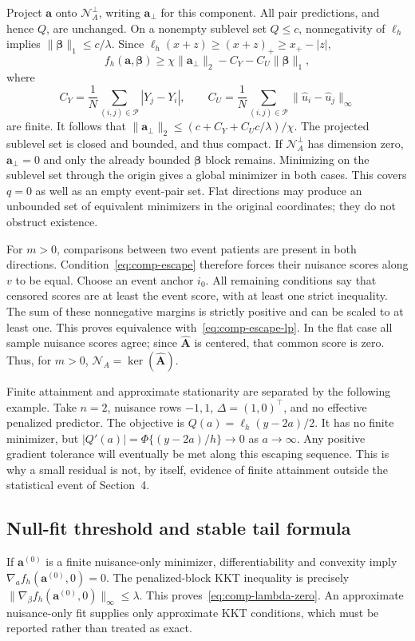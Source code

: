 Project $\bm{a}$ onto $\mathcal N_A^\perp$, writing $\bm{a}_\perp$ for this component. All pair predictions, and hence $Q$, are unchanged. On a nonempty sublevel set $Q\le c$, nonnegativity of $\ell_h$ implies $\|\bm{\beta}\|_1\le c/\lambda$. Since $\ell_h(x+z)\ge(x+z)_+\ge x_+-|z|$,
\[
 f_h(\bm{a},\bm{\beta})\ge\chi\|\bm{a}_\perp\|_2-C_Y-C_U\|\bm{\beta}\|_1,
\]
where
\[
 C_Y=\frac1N\sum_{(i,j)\in\mathcal P}|Y_j-Y_i|,\qquad
 C_U=\frac1N\sum_{(i,j)\in\mathcal P}\|\widehat u_i-\widehat u_j\|_\infty
\]
are finite. It follows that $\|\bm{a}_\perp\|_2\le(c+C_Y+C_Uc/\lambda)/\chi$. The projected sublevel set is closed and bounded, and thus compact. If $\mathcal N_A^\perp$ has dimension zero, $\bm{a}_\perp=0$ and only the already bounded $\bm{\beta}$ block remains. Minimizing on the sublevel set through the origin gives a global minimizer in both cases. This covers $q=0$ as well as an empty event-pair set. Flat directions may produce an unbounded set of equivalent minimizers in the original coordinates; they do not obstruct existence.

For $m>0$, comparisons between two event patients are present in both directions. Condition~\eqref{eq:comp-escape} therefore forces their nuisance scores along $v$ to be equal. Choose an event anchor $i_0$. All remaining conditions say that censored scores are at least the event score, with at least one strict inequality. The sum of these nonnegative margins is strictly positive and can be scaled to at least one. This proves equivalence with~\eqref{eq:comp-escape-lp}. In the flat case all sample nuisance scores agree; since $\widehat{\bm{A}}$ is centered, that common score is zero. Thus, for $m>0$, $\mathcal N_A=\ker(\widehat{\bm{A}})$.

Finite attainment and approximate stationarity are separated by the following example. Take $n=2$, nuisance rows $-1,1$, $\Delta=(1,0)^\top$, and no effective penalized predictor. The objective is $Q(a)=\ell_h(y-2a)/2$. It has no finite minimizer, but $|Q'(a)|=\Phi\{(y-2a)/h\}\to0$ as $a\to\infty$. Any positive gradient tolerance will eventually be met along this escaping sequence. This is why a small residual is not, by itself, evidence of finite attainment outside the statistical event of Section~4.

\subsection{Null-fit threshold and stable tail formula}
\label{subapp:comp-tail}
If $\bm{a}^{(0)}$ is a finite nuisance-only minimizer, differentiability and convexity imply $\nabla_a f_h(\bm{a}^{(0)},0)=0$. The penalized-block KKT inequality is precisely $\|\nabla_\beta f_h(\bm{a}^{(0)},0)\|_\infty\le\lambda$. This proves~\eqref{eq:comp-lambda-zero}. An approximate nuisance-only fit supplies only approximate KKT conditions, which must be reported rather than treated as exact.

